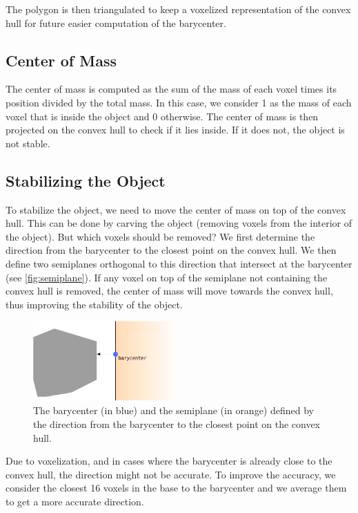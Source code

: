 \documentclass[tikz,10pt,fleqn]{article}
\begin{document}
The polygon is then triangulated to keep a voxelized representation of the convex hull for future easier computation of the barycenter.

\subsection{Center of Mass}
The center of mass is computed as the sum of the mass of each voxel times its position divided by the total mass. In this case, we consider 1 as the mass of each voxel that is inside the object and 0 otherwise. The center of mass is then projected on the convex hull to check if it lies inside. If it does not, the object is not stable.

\subsection{Stabilizing the Object}
To stabilize the object, we need to move the center of mass on top of the convex hull. This can be done by carving the object (removing voxels from the interior of the object). But which voxels should be removed? We first determine the direction from the barycenter to the closest point on the convex hull. We then define two semiplanes orthogonal to this direction that intersect at the barycenter (see \autoref{fig:semiplane}). If any voxel on top of the semiplane not containing the convex hull is removed, the center of mass will move towards the convex hull, thus improving the stability of the object.

\begin{figure}[h]
    \centering
    \includegraphics[width=0.5\textwidth]{fig/semiplane.pdf}
    \caption{The barycenter (in blue) and the semiplane (in orange) defined by the direction from the barycenter to the closest point on the convex hull.}
    \label{fig:semiplane}
\end{figure}

Due to voxelization, and in cases where the barycenter is already close to the convex hull, the direction might not be accurate. To improve the accuracy, we consider the closest 16 voxels in the base to the barycenter and we average them to get a more accurate direction.
\end{document}
